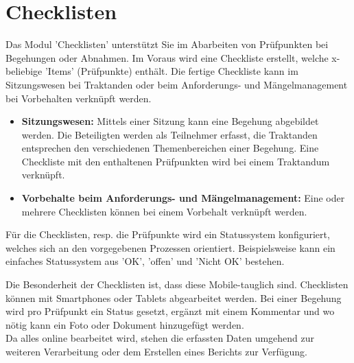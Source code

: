 \clearpage
\section{Checklisten}
\label{bkm:Ref2018102501}

Das Modul 'Checklisten' unterstützt Sie im Abarbeiten von Prüfpunkten bei Begehungen oder Abnahmen. Im Voraus wird eine Checkliste erstellt, welche x-beliebige 'Items' (Prüfpunkte) enthält. Die fertige Checkliste kann im Sitzungswesen bei Traktanden oder beim Anforderungs- und Mängelmanagement bei Vorbehalten verknüpft werden.

\begin{itemize}
\item
\textbf{Sitzungswesen:} Mittels einer Sitzung kann eine Begehung abgebildet werden. Die Beteiligten werden als Teilnehmer erfasst, die Traktanden entsprechen den verschiedenen Themenbereichen einer Begehung. Eine Checkliste mit den enthaltenen Prüfpunkten wird bei einem Traktandum verknüpft.
\item
\textbf{Vorbehalte beim Anforderungs- und Mängelmanagement:} Eine oder mehrere Checklisten können bei einem Vorbehalt verknüpft werden.
\end{itemize}

Für die Checklisten, resp. die Prüfpunkte wird ein Statussystem konfiguriert, welches sich an den vorgegebenen Prozessen orientiert. Beispielsweise kann ein einfaches Statussystem aus 'OK', 'offen' und 'Nicht OK' bestehen.

\vspace{\baselineskip}

Die Besonderheit der Checklisten ist, dass diese Mobile-tauglich sind. Checklisten können mit Smartphones oder Tablets abgearbeitet werden. Bei einer Begehung wird pro Prüfpunkt ein Status gesetzt, ergänzt mit einem Kommentar und wo nötig kann ein Foto oder Dokument hinzugefügt werden.\\
Da alles online bearbeitet wird, stehen die erfassten Daten umgehend zur weiteren Verarbeitung oder dem Erstellen eines Berichts zur Verfügung.

\vspace{\baselineskip}


